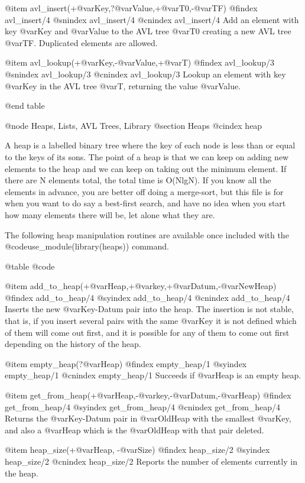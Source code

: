 {{{{{{{{{@item avl_insert(+@var{Key},?@var{Value},+@var{T0},-@var{TF})
@findex avl_insert/4
@snindex avl_insert/4
@cnindex avl_insert/4
Add an element with key @var{Key} and @var{Value} to the AVL tree
@var{T0} creating a new AVL tree @var{TF}. Duplicated elements are
allowed.

@item avl_lookup(+@var{Key},-@var{Value},+@var{T})
@findex avl_lookup/3
@snindex avl_lookup/3
@cnindex avl_lookup/3
Lookup an element with key @var{Key} in the AVL tree
@var{T}, returning the value @var{Value}.

@end table

@node Heaps, Lists, AVL Trees, Library
@section Heaps
@cindex heap

A heap is a labelled binary tree where the key of each node is less than
or equal to the keys of its sons.  The point of a heap is that we can
keep on adding new elements to the heap and we can keep on taking out
the minimum element.  If there are N elements total, the total time is
O(NlgN).  If you know all the elements in advance, you are better off
doing a merge-sort, but this file is for when you want to do say a
best-first search, and have no idea when you start how many elements
there will be, let alone what they are.

The following heap manipulation routines are available once included
with the @code{use_module(library(heaps))} command. 

@table @code

@item add_to_heap(+@var{Heap},+@var{key},+@var{Datum},-@var{NewHeap})
@findex add_to_heap/4
@syindex        add_to_heap/4
@cnindex        add_to_heap/4
Inserts the new @var{Key-Datum} pair into the heap. The insertion is not
stable, that is, if you insert several pairs with the same @var{Key} it
is not defined which of them will come out first, and it is possible for
any of them to come out first depending on the  history of the heap.

@item empty_heap(?@var{Heap})
@findex empty_heap/1
@syindex        empty_heap/1
@cnindex        empty_heap/1
Succeeds if @var{Heap} is an empty heap.

@item get_from_heap(+@var{Heap},-@var{key},-@var{Datum},-@var{Heap})
@findex get_from_heap/4
@syindex        get_from_heap/4
@cnindex        get_from_heap/4
Returns the @var{Key-Datum} pair in @var{OldHeap} with the smallest
@var{Key}, and also a @var{Heap} which is the @var{OldHeap} with that
pair deleted.

@item heap_size(+@var{Heap}, -@var{Size})
@findex heap_size/2
@syindex        heap_size/2
@cnindex        heap_size/2
Reports the number of elements currently in the heap.

}}}}}}}}}
